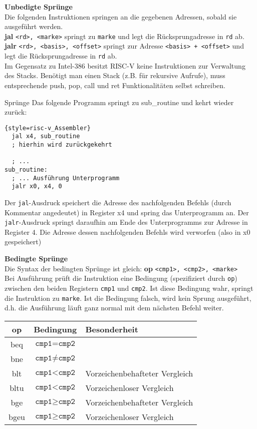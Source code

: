 \textbf{Unbedigte Sprünge}\\

Die folgenden Instruktionen springen an die gegebenen Adressen, sobald sie ausgeführt werden.\\
\textbf{jal} \texttt{<rd>, <marke>} springt zu \texttt{marke} und legt die Rücksprungadresse in \texttt{rd} ab.\\
\textbf{jalr} \texttt{<rd>, <basis>, <offset>} springt zur Adresse \texttt{<basis> + <offset>} und legt die Rücksprungadresse in \texttt{rd} ab.\\

Im Gegensatz zu Intel-386 besitzt RISC-V keine Instruktionen zur Verwaltung des Stacks. Benötigt man einen Stack (z.B. für rekursive Aufrufe), muss entsprechende push, pop, call und ret Funktionalitäten selbst schreiben.

\begin{exampleblock}{Sprünge}
Das folgende Programm springt zu sub\_routine und kehrt wieder zurück:
\begin{lstlisting}{style=risc-v_Assembler}
  jal x4, sub_routine
  ; hierhin wird zurückgekehrt
  
  ; ...
sub_routine:
  ; ... Ausführung Unterprogramm
  jalr x0, x4, 0
\end{lstlisting}
Der \texttt{jal}-Ausdruck speichert die Adresse des nachfolgenden Befehls (durch Kommentar angedeutet) in Register x4 und spring das Unterprogramm an. Der \texttt{jalr}-Ausdruck springt daraufhin am Ende des Unterprogramms zur Adresse in Register 4. Die Adresse dessen nachfolgenden Befehls wird verworfen (also in x0 gespeichert)
\end{exampleblock}

\textbf{Bedingte Sprünge}\\

Die Syntax der bedingten Sprünge ist gleich: \textbf{op} \texttt{<cmp1>, <cmp2>, <marke>}\\
Bei Ausführung prüft die Instruktion eine Bedingung (spezifiziert durch \texttt{op}) zwischen den beiden Registern \texttt{cmp1} und \texttt{cmp2}. Ist diese Bedingung wahr, springt die Instruktion zu \texttt{marke}. Ist die Bedingung falsch, wird kein Sprung ausgeführt, d.h. die Ausführung läuft ganz normal mit dem nächsten Befehl weiter.\\
\begin{tabular}{|c|c|l|}
	\hline
	op & Bedingung & Besonderheit\\
	\hline
	beq & $\texttt{cmp1} = \texttt{cmp2}$ & \\
	\hline
	bne & $\texttt{cmp1} \ne \texttt{cmp2}$ & \\
	\hline
	blt & $\texttt{cmp1} < \texttt{cmp2}$ & Vorzeichenbehafteter Vergleich\\
	\hline
	bltu & $\texttt{cmp1} < \texttt{cmp2}$ & Vorzeichenloser Vergleich\\
	\hline
	bge & $\texttt{cmp1} \ge \texttt{cmp2}$ & Vorzeichenbehafteter Vergleich\\
	\hline
	bgeu & $\texttt{cmp1} \ge \texttt{cmp2}$ & Vorzeichenloser Vergleich\\
	\hline
\end{tabular}

